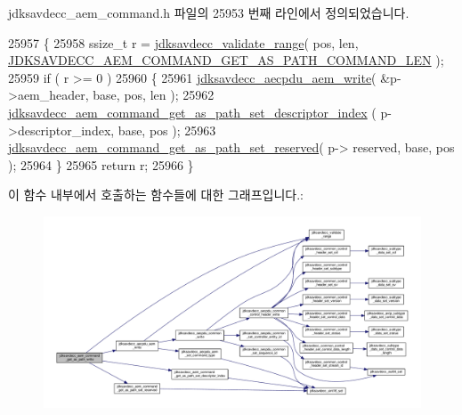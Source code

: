 jdksavdecc\+\_\+aem\+\_\+command.\+h 파일의 25953 번째 라인에서 정의되었습니다.


\begin{DoxyCode}
25957 \{
25958     ssize\_t r = \hyperlink{group__util_ga9c02bdfe76c69163647c3196db7a73a1}{jdksavdecc\_validate\_range}( pos, len, 
      \hyperlink{group__command__get__as__path_ga2f85175bfed0a804e0cce9639a16eb98}{JDKSAVDECC\_AEM\_COMMAND\_GET\_AS\_PATH\_COMMAND\_LEN} );
25959     \textcolor{keywordflow}{if} ( r >= 0 )
25960     \{
25961         \hyperlink{group__aecpdu__aem_gad658e55771cce77cecf7aae91e1dcbc5}{jdksavdecc\_aecpdu\_aem\_write}( &p->aem\_header, base, pos, len );
25962         \hyperlink{group__command__get__as__path_ga18df54cdd2907e882818275e04699f66}{jdksavdecc\_aem\_command\_get\_as\_path\_set\_descriptor\_index}
      ( p->descriptor\_index, base, pos );
25963         \hyperlink{group__command__get__as__path_ga13cea446e3aceee3101e3e07c67b2f29}{jdksavdecc\_aem\_command\_get\_as\_path\_set\_reserved}( p->
      reserved, base, pos );
25964     \}
25965     \textcolor{keywordflow}{return} r;
25966 \}
\end{DoxyCode}


이 함수 내부에서 호출하는 함수들에 대한 그래프입니다.\+:
\nopagebreak
\begin{figure}[H]
\begin{center}
\leavevmode
\includegraphics[width=350pt]{group__command__get__as__path_ga02124c62f45a6f1e49ab5e5325beae38_cgraph}
\end{center}
\end{figure}


